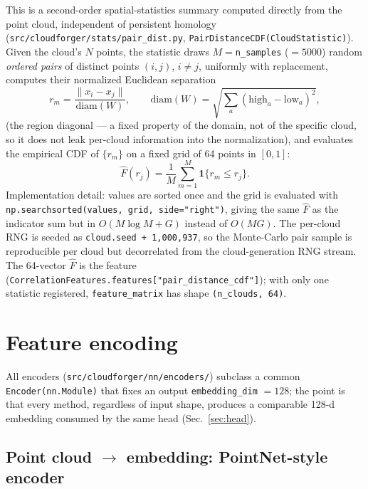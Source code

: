 \documentclass[11pt]{article}
\begin{document}
This is a second-order spatial-statistics summary computed directly from the
point cloud, independent of persistent homology
(\texttt{src/cloudforger/stats/pair\_dist.py},
\texttt{PairDistanceCDF(CloudStatistic)}). Given the cloud's $N$ points, the
statistic draws $M=$\texttt{n\_samples} ($=5000$) random \emph{ordered pairs}
of distinct points $(i,j)$, $i\ne j$, uniformly with replacement, computes
their normalized Euclidean separation
\[
  r_m = \frac{\lVert x_i - x_j\rVert}{\mathrm{diam}(W)}, \qquad
  \mathrm{diam}(W) = \sqrt{\textstyle\sum_a (\text{high}_a-\text{low}_a)^2},
\]
(the region diagonal — a fixed property of the domain, not of the specific
cloud, so it does not leak per-cloud information into the normalization),
and evaluates the empirical CDF of $\{r_m\}$ on a fixed grid of 64 points in
$[0,1]$:
\[
  \hat F(r_j) = \frac{1}{M}\sum_{m=1}^M \mathbf 1\{r_m \le r_j\}.
\]
Implementation detail: values are sorted once and the grid is evaluated with
\texttt{np.searchsorted(values, grid, side="right")}, giving the same
$\hat F$ as the indicator sum but in $O(M\log M + G)$ instead of $O(MG)$. The
per-cloud RNG is seeded as \texttt{cloud.seed + 1{,}000{,}937}, so the
Monte-Carlo pair sample is reproducible per cloud but decorrelated from the
cloud-generation RNG stream. The 64-vector $\hat F$ is the feature
(\texttt{CorrelationFeatures.features["pair\_distance\_cdf"]}); with only one
statistic registered, \texttt{feature\_matrix} has shape
\texttt{(n\_clouds, 64)}.

\section{Feature encoding}

All encoders (\texttt{src/cloudforger/nn/encoders/}) subclass a common
\texttt{Encoder(nn.Module)} that fixes an output \texttt{embedding\_dim}
$=128$; the point is that every method, regardless of input shape, produces
a comparable 128-d embedding consumed by the same head (Sec.~\ref{sec:head}).

\subsection{Point cloud $\to$ embedding: PointNet-style encoder}
\end{document}
